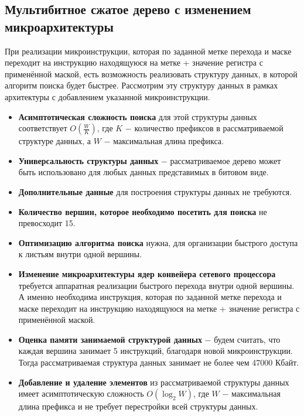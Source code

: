 \documentclass[a4paper, 12pt, titlepage, finall]{extreport}
\begin{document}
        \subsection{Мультибитное сжатое дерево с изменением микроархитектуры}
            При реализации микроинструкции, которая по заданной метке перехода и маске переходит на инструкцию находящуюся на метке + значение регистра с применённой маской,
            есть возможность реализовать структуру данных, в которой алгоритм поиска будет быстрее. Рассмотрим эту структуру данных в рамках архитектуры с добавлением указанной микроинструкции.\\
            \begin{itemize}
                \item\textbf{Асимптотическая сложность поиска} для этой структуры данных соответствует {\ttfamily $O(\frac{W}{K})$},
                где {\ttfamily $K$} $-$ количество префиксов в рассматриваемой структуре данных, а {\ttfamily $W$} $-$ максимальная длина префикса.
                \item\textbf{Универсальность структуры данных} $-$ рассматриваемое дерево может быть использовано для любых данных представимых в битовом виде.
                \item\textbf{Дополнительные данные} для построения структуры данных не требуются.
                \item\textbf{Количество вершин, которое необходимо посетить для поиска} не превосходит 15.
                \item\textbf{Оптимизацию алгоритма поиска} нужна, для организации быстрого доступа к листьям внутри одной вершины.
                \item\textbf{Изменение микроархитектуры ядер конвейера сетевого процессора} требуется аппаратная реализации быстрого перехода внутри одной вершины.
                А именно необходима инструкция, которая по заданной метке перехода и маске переходит на инструкцию находящуюся на метке + значение регистра с применённой маской.
                \item\textbf{Оценка памяти занимаемой структурой данных} $-$ будем считать, что каждая вершина занимает 5 инструкций, благодаря новой микроинструкции.
                Тогда рассматриваемая структура данных занимает не более чем 47000 Кбайт.
                \item\textbf{Добавление и удаление элементов} из рассматриваемой структуры данных имеет асимптотическую сложность 
                {\ttfamily $O(\log_2{W})$}, где {\ttfamily $W$} $-$ максимальная длина префикса и не требует перестройки всей структуры данных.\\
            \end{itemize}
\end{document}
